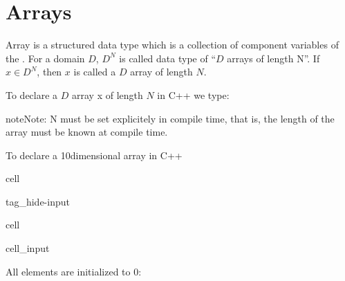 \documentclass[a4paper,10pt,english]{jupyterBook}
\begin{document}
\sphinxstepscope


\chapter{Arrays}
\label{\detokenize{text/progtut/arrays:arrays}}\label{\detokenize{text/progtut/arrays::doc}}
\sphinxAtStartPar
Array is a structured data type which is a collection of component variables of the . For a domain \(D\),  \(D^{N}\) is called data type of “\(D\) arrays of length N”. If \(x\in D^N\), then \(x\) is called a \(D\) array of length \(N\).

\sphinxAtStartPar
To declare a \(D\) array x of length \(N\) in C++ we type:

\begin{sphinxVerbatim}[commandchars=\\\{\}]
 \PYG{p}{[}\PYG{p}{]}
\end{sphinxVerbatim}

\begin{sphinxadmonition}{note}{Note:}
\sphinxAtStartPar
N must be set explicitely in compile time, that is, the length of the array must be known at compile time.
\end{sphinxadmonition}

\sphinxAtStartPar
To declare a 10\sphinxhyphen{}dimensional  array in C++

\begin{sphinxuseclass}{cell}
\begin{sphinxuseclass}{tag_hide-input}
\end{sphinxuseclass}
\end{sphinxuseclass}
\begin{sphinxuseclass}{cell}\begin{sphinxVerbatimInput}

\begin{sphinxuseclass}{cell_input}
\begin{sphinxVerbatim}[commandchars=\\\{\}]
\PYG{p}{[}\PYG{p}{]}
\end{sphinxVerbatim}

\end{sphinxuseclass}\end{sphinxVerbatimInput}

\end{sphinxuseclass}
\sphinxAtStartPar
All elements are initialized to 0:
\end{document}
